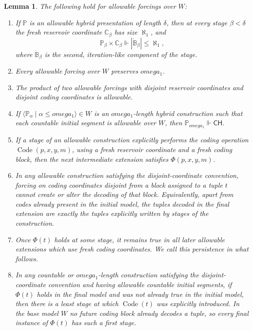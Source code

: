 \documentclass{article}
\newtheorem{lemma}[theorem]{Lemma}
\theoremstyle{remark}
\theoremstyle{plain}
\newcommand{\forceP}{\mathbb{P}}
\newcommand{\Code}{\operatorname{Code}}
\newcommand{\CH}{\mathsf{CH}}
\def\omega{omega}%
\begin{document}
\begin{lemma}\label{lem:basic-preservation}
The following hold for allowable forcings over $W$:
\begin{enumerate}[label=\textup{(\roman*)}]
\item If $\forceP$ is an allowable hybrid presentation of length $\delta$, then at every stage $\beta<\delta$ the fresh reservoir coordinate $\mathbb C_\beta$ has size $\aleph_1$, and
\[
   \forceP_\beta\times\mathbb C_\beta
   \Vdash
   |\dot{\mathbb B}_\beta|\leq\aleph_1,
\]
where $\dot{\mathbb B}_\beta$ is the second, iteration-like component of the stage.
\item Every allowable forcing over $W$ preserves $\omega_1$.
\item The product of two allowable forcings with disjoint reservoir coordinates and disjoint coding coordinates is allowable.
\item If $\langle\forceP_\alpha\mid\alpha\leq\omega_1\rangle\in W$ is an $\omega_1$-length hybrid construction such that each countable initial segment is allowable over $W$, then $\forceP_{\omega_1} \Vdash \CH$.
\item  If a stage of an allowable construction explicitly performs the coding operation $\Code(p,x,y,m)$, using a fresh reservoir coordinate and a fresh coding block, then the next intermediate extension satisfies $\Phi(p,x,y,m)$.
\item  In any allowable construction satisfying the disjoint-coordinate convention, forcing on coding coordinates disjoint from a block assigned to a tuple $t$ cannot create or alter the decoding of that block. Equivalently, apart from codes already present in the initial model, the tuples decoded in the final extension are exactly the tuples explicitly written by stages of the construction.
\item  Once $\Phi(t)$ holds at some stage, it remains true in all later allowable extensions which use fresh coding coordinates. We call this persistence in what follows.
\item  In any countable or $\omega_1$-length construction satisfying the disjoint-coordinate convention and having allowable countable initial segments, if $\Phi(t)$ holds in the final model and was not already true in the initial model, then there is a least stage at which $\Code(t)$ was explicitly introduced. In the base model $W$ no future coding block already decodes a tuple, so every final instance of $\Phi(t)$ has such a first stage.
\end{enumerate}
\end{lemma}
\end{document}
